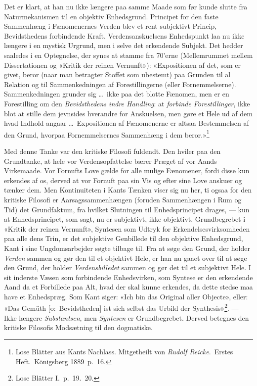 \documentclass[12pt,a4paper]{article}
\newcommand{\apage}[1]{\marginnote{\footnotesize\textit{[#1]}}}
\begin{document}
Det er klart, at han nu ikke længere paa samme Maade som før kunde slutte
fra Naturmekanismen til en objektiv Enhedsgrund. Principet for den faste
Sammenhæng i Fænomenernes Verden blev et rent subjektivt Princip,
Bevidsthedens forbindende Kraft. Verdensanskuelsens Enhedspunkt laa nu
ikke længere i en mystisk Urgrund, men i selve det erkendende Subjekt.
Det hedder saaledes i en Optegnelse, der synes at stamme fra 70'erne
(Mellemrummet mellem Dissertationen og «Kritik der reinen Vernunft»):
«Expositionen af det, som er givet, beror (naar man betragter Stoffet som
ubestemt) paa Grunden til al Relation og til Sammenkedningen af
Forestillingerne (eller Fornemmelserne). Sammenkedningen grunder sig
\ldots\ ikke paa det blotte Fænomen, men er en Forestilling om \apage{15} den
\emph{Bevidsthedens indre Handling}: at \emph{forbinde Forestillinger}, ikke blot at
stille dem jevnsides hverandre for Anskuelsen, men gøre et Hele ud af dem
hvad Indhold angaar \ldots\ Expositionen af Fænomenerne er altsaa
Bestemmelsen af den Grund, hvorpaa Fornemmelsernes Sammenhæng i dem
beror.»\footnote{Lose Blätter aus Kants Nachlass. Mitgetheilt
von \emph{Rudolf Reicke}.\ Erstes Heft.\ Königsberg 1889\ p.\ 16.}

Med denne Tanke var den kritiske Filosofi fuldendt. Den hviler paa den
Grundtanke, at hele vor Verdensopfattelse bærer Præget af vor Aands
Virkemaade. Vor Fornufts Love gælde for alle mulige Fænomener, fordi
disse kun erkendes af os, derved at vor Fornuft paa sin Vis og efter sine
Love anskuer og tænker dem. Men Kontinuiteten i Kants Tænken viser sig nu
her, ti ogsaa for den kritiske Filosofi er Aarsagssammenhængen (foruden
Sammenhængen i Rum og Tid) det Grundfaktum, fra hvilket Slutningen til
Enhedsprincipet drages, --- kun at Enhedsprincipet, som sagt, nu er
subjektivt, ikke objektivt. Grundbegrebet i «Kritik der reinen Vernunft»,
Syntesen som Udtryk for Erkendelsesvirksomheden paa alle dens Trin, er
det subjektive Genbillede til den objektive Enhedsgrund, Kant i sine
Ungdomsarbejder søgte tilbage til. Fra at søge den Grund, der holder
\emph{Verden} sammen og gør den til et objektivt Hele, er han nu gaaet over til
at søge den Grund, der holder \emph{Verdensbilledet} sammen og gør det til et
subjektivt Hele. I sit inderste Væsen som forbindende Enhedsvirken, som
Syntese er den erkendende Aand da et Forbillede paa Alt, hvad der skal
kunne erkendes, da dette stedse maa have et Enhedspræg. Som Kant siger:
«Ich bin das Original aller Objecte», eller: «Das Gemüth [o:\
Bevidstheden] ist sich selbst das Urbild der
Synthesis»\footnote{Lose Blätter I.\ p.\ 19.\ 20.}. --- Ikke
længere \emph{Substantsen}, men \emph{Syntesen} er Grundbegrebet. Derved betegnes den
kritiske Filosofis Modsætning til den dogmatiske.
\end{document}

